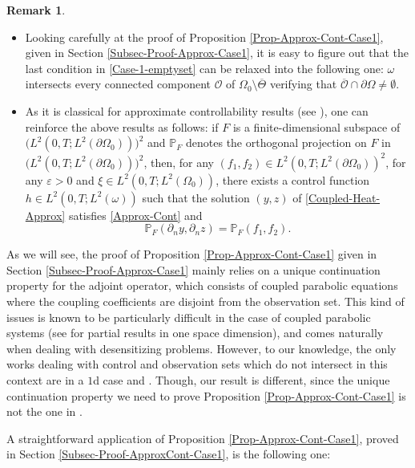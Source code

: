 \documentclass[JEP,XML,SOM,Unicode,NoFloatCountersInSection]{cedram}
\theoremstyle{definition}
\newtheorem{remark}[theorem]{Remark}
\begin{document}
\skpt
\begin{remark}
\begin{itemize}
\item Looking carefully at the proof of Proposition \ref{Prop-Approx-Cont-Case1}, given in Section \ref{Subsec-Proof-Approx-Case1}, it is easy to figure out that the last condition in \eqref{Case-1-emptyset} can be relaxed {into the following one: $\omega$ intersects every connected component $\mathcal O$ of $\Omega_0 \setminus \overline\Theta$ verifying that $\overline{\mathcal O} \cap \partial \Omega \not = \emptyset$.}

\item As it is classical for approximate controllability results (see \cite{Zuazua-97,FernandezCaraZuazua1,Ervedoza-Note-2020}), one can reinforce the above results as follows: if $F$ is a finite-dimensional subspace of $\bigl(L^2(0, T; L^2(\partial \Omega_0))\bigr)^2$ and $\mathbb{P}_F$ denotes the orthogonal projection on $F$ in $\bigl(L^2(0, T; L^2(\partial \Omega_0))\bigr)^2$, then, for any $(f_1, f_2) \in L^2(0,T; L^2(\partial \Omega_0))^2$, for any $\varepsilon >0$ and $\xi \in L^2(0,T; L^2(\Omega_0))$, there exists a control function $h \in L^2(0,T; L^2(\omega))$ such that the solution $(y,z)$ of \eqref{Coupled-Heat-Approx} satisfies \eqref{Approx-Cont} and
\[
\mathbb{P}_F (\partial_n y, \partial_n z) = \mathbb{P}_F (f_1, f_2).
\]
\end{itemize}
\end{remark}

As we will see, the proof of Proposition \ref{Prop-Approx-Cont-Case1} given in Section \ref{Subsec-Proof-Approx-Case1} mainly relies on a unique continuation property for the adjoint operator, which consists of coupled parabolic equations where the coupling coefficients are disjoint from the observation set. This kind of issues is known to be particularly difficult in the case of coupled parabolic systems (see \eg \cite{mousquetaires} for partial results in one space dimension), and comes naturally when dealing with desensitizing problems. However, to our knowledge, the only works dealing with control and observation sets which do not intersect in this context are \cite{Micu-Ortega-deTeresa} in a $1$d case and \cite{Kavian-De-Teresa}. Though, our result is different, since the unique continuation property we need to prove Proposition \ref{Prop-Approx-Cont-Case1} is not the one in \cite{Micu-Ortega-deTeresa,Kavian-De-Teresa}.

A straightforward application of Proposition \ref{Prop-Approx-Cont-Case1}, proved in Section \ref{Subsec-Proof-ApproxCont-Case1}, is the following one:
\end{document}
